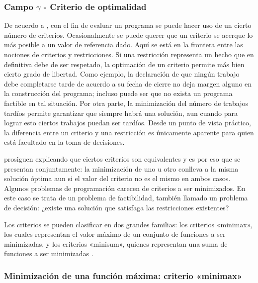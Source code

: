 \documentclass[spanish,draft,12pt,headsepline,footsepline,paper=letter]{scrreprt}
\begin{document}
\subsubsection{Campo $\gamma$ - Criterio de optimalidad}

De acuerdo a \citet[p.~12]{TKindt2002}, con el fin de evaluar un programa se puede hacer uso de un cierto número de criterios. Ocasionalmente se puede querer que un criterio se acerque lo más posible a un valor de referencia dado. Aquí se está en la frontera entre las nociones de criterios y restricciones. Si una restricción representa un hecho que en definitiva debe de ser respetado, la optimación de un criterio permite más bien cierto grado de libertad. Como ejemplo, la declaración de que ningún trabajo debe completarse tarde de acuerdo a su fecha de cierre no deja margen alguno en la construcción del programa; incluso puede ser que no exista un programa factible en tal situación. Por otra parte, la minimización del número de trabajos tardíos permite garantizar que siempre habrá una solución, aun cuando para lograr esto ciertos trabajos puedan ser tardíos. Desde un punto de vista práctico, la diferencia entre un criterio y una restricción es únicamente aparente para quien está facultado en la toma de decisiones.

\citet[p.~12,~13]{TKindt2002} prosiguen explicando que ciertos criterios son equivalentes y es por eso que se presentan conjuntamente: la minimización de uno u otro conlleva a la misma solución óptima aun si el valor del criterio no es el mismo en ambos casos. Algunos problemas de programación carecen de criterios a ser minimizados. En este caso se trata de un problema de factibilidad, también llamado un problema de decisión: ¿existe una solución que satisfaga las restricciones existentes?

Los criterios se pueden clasificar en dos grandes familias: los criterios «minimax», los cuales representan el valor máximo de un conjunto de funciones a ser minimizadas, y los criterios «minisum», quienes representan una suma de funciones a ser minimizadas \citep[p.~13]{TKindt2002}.

\subsubsection[Criterio «minimax»]{Minimización de una función máxima: criterio «minimax»}
\end{document}
